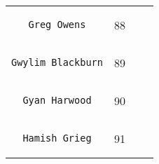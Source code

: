 \documentclass[]{article}
\begin{document}
\begin{longtable}[c]{@{}llll@{}}
\begin{minipage}[t]{0.39\columnwidth}
\begin{verbatim}
   Greg Owens
\end{verbatim}
\end{minipage} & \begin{minipage}[t]{0.10\columnwidth}\raggedright
88
\end{minipage} & \begin{minipage}[t]{0.13\columnwidth}\raggedright
\end{minipage} & \begin{minipage}[t]{0.15\columnwidth}\raggedright
\end{minipage}
\\\noalign{\medskip}
\begin{minipage}[t]{0.39\columnwidth}\raggedright
\begin{verbatim}
Gwylim Blackburn
\end{verbatim}
\end{minipage} & \begin{minipage}[t]{0.10\columnwidth}\raggedright
89
\end{minipage} & \begin{minipage}[t]{0.13\columnwidth}\raggedright
\end{minipage} & \begin{minipage}[t]{0.15\columnwidth}\raggedright
\end{minipage}
\\\noalign{\medskip}
\begin{minipage}[t]{0.39\columnwidth}\raggedright
\begin{verbatim}
  Gyan Harwood
\end{verbatim}
\end{minipage} & \begin{minipage}[t]{0.10\columnwidth}\raggedright
90
\end{minipage} & \begin{minipage}[t]{0.13\columnwidth}\raggedright
\end{minipage} & \begin{minipage}[t]{0.15\columnwidth}\raggedright
\end{minipage}
\\\noalign{\medskip}
\begin{minipage}[t]{0.39\columnwidth}\raggedright
\begin{verbatim}
  Hamish Grieg
\end{verbatim}
\end{minipage} & \begin{minipage}[t]{0.10\columnwidth}\raggedright
91
\end{minipage} & \begin{minipage}[t]{0.13\columnwidth}\raggedright

\end{minipage}
\end{longtable}
\end{document}
